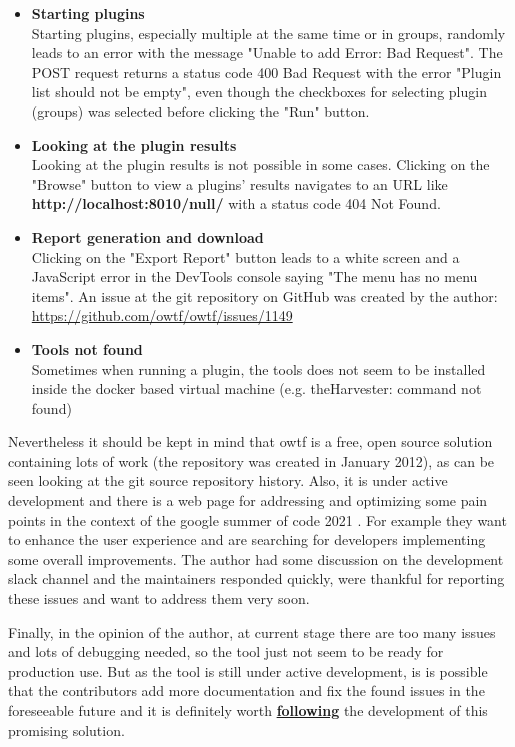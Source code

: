 \begin{itemize}
	\item \textbf{Starting plugins}\\
	Starting plugins, especially multiple at the same time or in groups, randomly leads to an error with the message "Unable to add Error: Bad Request". The POST request returns a status code 400 Bad Request with the error "Plugin list should not be empty", even though the checkboxes for selecting plugin (groups) was selected before clicking the "Run" button.
	\item \textbf{Looking at the plugin results}\\
	Looking at the plugin results is not possible in some cases. Clicking on the "Browse" button to view a plugins' results navigates to an URL like \textbf{http://localhost:8010/null/} with a status code 404 Not Found.
	\item \textbf{Report generation and download}\\
	Clicking on the "Export Report" button leads to a white screen and a JavaScript error in the DevTools console saying "The menu has no menu items". An issue at the git repository on GitHub was created by the author: \href{https://github.com/owtf/owtf/issues/1149}{https://github.com/owtf/owtf/issues/1149}
	\item \textbf{Tools not found}\\
	Sometimes when running a plugin, the tools does not seem to be installed inside the docker based virtual machine (e.g. theHarvester: command not found)
\end{itemize}

Nevertheless it should be kept in mind that \ac{owtf} is a free, open source solution containing lots of work (the repository was created in January 2012), as can be seen looking at the git source repository history. 
Also, it is under active development and there is a web page for addressing and optimizing some pain points in the context of the google summer of code 2021 \cite{GSoC2021.11.06.2021}. For example they want to enhance the user experience and are searching for developers implementing some overall improvements. The author had some discussion on the development slack channel and the maintainers responded quickly, were thankful for reporting these issues and want to address them very soon.

Finally, in the opinion of the author, at current stage there are too many issues and lots of debugging needed, so the tool just not seem to be ready for production use. But as the tool is still under active development, is is possible that the contributors add more documentation and fix the found issues in the foreseeable future and it is definitely worth \textbf{\href{https://twitter.com/owtfp/}{following}} the development of this promising solution.
